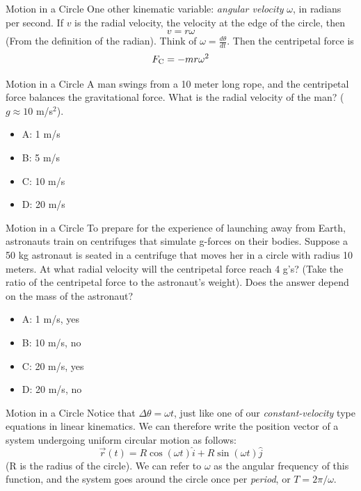 \documentclass{beamer}
\begin{document}
\begin{frame}{Motion in a Circle}
One other kinematic variable: \textit{angular velocity} $\omega$, in radians per second.  If $v$ is the radial velocity, the velocity at the edge of the circle, then 
\begin{equation}
v = r\omega
\end{equation}
(From the definition of the radian).  Think of $\omega = \frac{d\theta}{dt}$.  Then the centripetal force is
\begin{equation}
F_{\rm C} = - m r \omega^2
\end{equation}
\end{frame}

\begin{frame}{Motion in a Circle}
A man swings from a 10 meter long rope, and the centripetal force balances the gravitational force.  What is the radial velocity of the man? ($g \approx 10$ m/s$^2$).
\begin{itemize}
\item A: 1 m/s
\item B: 5 m/s
\item C: 10 m/s
\item D: 20 m/s
\end{itemize}
\end{frame}

\begin{frame}{Motion in a Circle}
To prepare for the experience of launching away from Earth, astronauts train on centrifuges that simulate g-forces on their bodies.  Suppose a 50 kg astronaut is seated in a centrifuge that moves her in a circle with radius 10 meters.  At what radial velocity will the centripetal force reach 4 g's?  (Take the ratio of the centripetal force to the astronaut's weight).  Does the answer depend on the mass of the astronaut?
\begin{itemize}
\item A: 1 m/s, yes
\item B: 10 m/s, no
\item C: 20 m/s, yes
\item D: 20 m/s, no
\end{itemize}
\end{frame}

\begin{frame}{Motion in a Circle}
Notice that $\Delta \theta = \omega t$, just like one of our \textit{constant-velocity} type equations in linear kinematics.  We can therefore write the position vector of a system undergoing uniform circular motion as follows:
\begin{equation}
\vec{r}(t) = R\cos(\omega t) \hat{i} + R\sin(\omega t) \hat{j}
\end{equation}
(R is the radius of the circle).  We can refer to $\omega$ as the angular frequency of this function, and the system goes around the circle once per \textit{period}, or $T = 2\pi/\omega$.
\end{frame}
\end{document}
